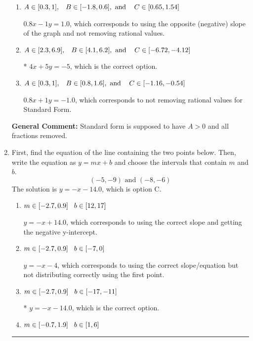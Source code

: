\documentclass{extbook}[14pt]
\newcommand{\litem}[1]{\item #1

\rule{\textwidth}{0.4pt}}
\begin{document}
\begin{enumerate}
{\begin{enumerate}[label=\Alph*.]
 $-4x - 5y = 5$, which corresponds to not making $A$ positive (by multiplying the equation by $-1$).
\item \( A \in [0.3, 1], \hspace{3mm} B \in [-1.8, 0.6], \text{ and } \hspace{3mm} C \in [0.65, 1.54] \)

 $0.8x - 1y = 1.0$, which corresponds to using the opposite (negative) slope of the graph and not removing rational values.
\item \( A \in [2.3, 6.9], \hspace{3mm} B \in [4.1, 6.2], \text{ and } \hspace{3mm} C \in [-6.72, -4.12] \)

* $4x + 5y = -5$, which is the correct option.
\item \( A \in [0.3, 1], \hspace{3mm} B \in [0.8, 1.6], \text{ and } \hspace{3mm} C \in [-1.16, -0.54] \)

 $0.8x + 1y = -1.0$, which corresponds to not removing rational values for Standard Form.
\end{enumerate}

\textbf{General Comment:} Standard form is supposed to have $A > 0$ and all fractions removed.
}
\litem{
First, find the equation of the line containing the two points below. Then, write the equation as $ y=mx+b $ and choose the intervals that contain $m$ and $b$.
\[ (-5, -9) \text{ and } (-8, -6) \]
The solution is \( y = -x -14.0 \), which is option C.\begin{enumerate}[label=\Alph*.]
\item \( m \in [-2.7, 0.9] \hspace*{3mm} b \in [12, 17] \)

 $y = -x + 14.0$, which corresponds to using the correct slope and getting the negative y-intercept.
\item \( m \in [-2.7, 0.9] \hspace*{3mm} b \in [-7, 0] \)

 $y = -x -4$, which corresponds to using the correct slope/equation but not distributing correctly using the first point.
\item \( m \in [-2.7, 0.9] \hspace*{3mm} b \in [-17, -11] \)

* $y = -x -14.0$, which is the correct option.
\item \( m \in [-0.7, 1.9] \hspace*{3mm} b \in [1, 6] \)


\end{enumerate}}
\end{enumerate}
\end{document}
